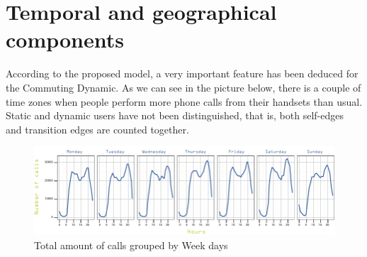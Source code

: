 \newpage
\section{Temporal and geographical components}

According to the proposed model, a very important feature has been deduced for the Commuting Dynamic. As we can see in the picture below, there is a couple of time zones when people perform more phone calls from their handsets than usual. Static and dynamic users have not been distinguished, that is, both self-edges and transition edges are counted together.

\begin{figure}[h]
\begin{center}
\includegraphics[scale =1.1] {results/images/calls_number.pdf}
\caption{Total amount of calls grouped by Week days}
\label{fig:count_calls}
\end{center}
\end{figure}



